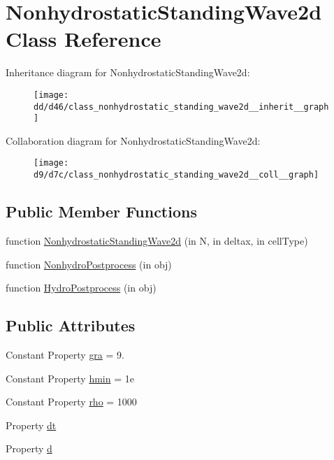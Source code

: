 \hypertarget{class_nonhydrostatic_standing_wave2d}{}\section{Nonhydrostatic\+Standing\+Wave2d Class Reference}
\label{class_nonhydrostatic_standing_wave2d}


Inheritance diagram for Nonhydrostatic\+Standing\+Wave2d\+:
\nopagebreak
\begin{figure}[H]
\begin{center}
\leavevmode
\texttt{[image: dd/d46/class\_nonhydrostatic\_standing\_wave2d\_\_inherit\_\_graph]}
\end{center}
\end{figure}


Collaboration diagram for Nonhydrostatic\+Standing\+Wave2d\+:
\nopagebreak
\begin{figure}[H]
\begin{center}
\leavevmode
\texttt{[image: d9/d7c/class\_nonhydrostatic\_standing\_wave2d\_\_coll\_\_graph]}
\end{center}
\end{figure}
\subsection*{Public Member Functions}
\begin{DoxyCompactItemize}
\item 
function \hyperlink{class_nonhydrostatic_standing_wave2d_aca37f45052a47586dc11bb3d07c67edb}{Nonhydrostatic\+Standing\+Wave2d} (in N, in deltax, in cell\+Type)
\item 
function \hyperlink{class_nonhydrostatic_standing_wave2d_aecb6bcacabd7861a83c3dc55d35c122d}{Nonhydro\+Postprocess} (in obj)
\item 
function \hyperlink{class_nonhydrostatic_standing_wave2d_ade5dee6bec07e215aea0c3c64eeecb35}{Hydro\+Postprocess} (in obj)
\end{DoxyCompactItemize}
\subsection*{Public Attributes}
\begin{DoxyCompactItemize}
\item 
Constant Property \hyperlink{class_nonhydrostatic_standing_wave2d_aec1ef638135dc23ee392eef50a3bb55b}{gra} = 9.
\item 
Constant Property \hyperlink{class_nonhydrostatic_standing_wave2d_ae6fe1ed7fee786ecc6fc2bd8d089f33d}{hmin} = 1e
\item 
Constant Property \hyperlink{class_nonhydrostatic_standing_wave2d_ae75f242ff807621baf2d8cd26680af10}{rho} = 1000
\item 
Property \hyperlink{class_nonhydrostatic_standing_wave2d_a83cad0ab87ecb30234c7f810fa4e7d35}{dt}
\item 
Property \hyperlink{class_nonhydrostatic_standing_wave2d_a71e9a36818a59519c259d64f6b2787d3}{d}
\end{DoxyCompactItemize}
